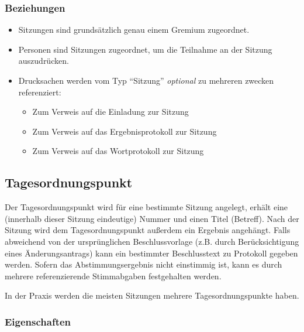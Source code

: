 \subsubsection{Beziehungen}

\begin{itemize}
\item
  Sitzungen sind grundsätzlich genau einem Gremium zugeordnet.
\item
  Personen sind Sitzungen zugeordnet, um die Teilnahme an der Sitzung
  auszudrücken.
\item
  Drucksachen werden vom Typ ``Sitzung'' \emph{optional} zu mehreren
  zwecken referenziert:

  \begin{itemize}
  \item
    Zum Verweis auf die Einladung zur Sitzung
  \item
    Zum Verweis auf das Ergebnisprotokoll zur Sitzung
  \item
    Zum Verweis auf das Wortprotokoll zur Sitzung
  \end{itemize}
\end{itemize}

\subsection{Tagesordnungspunkt}

Der Tagesordnungspunkt wird für eine bestimmte Sitzung angelegt, erhält
eine (innerhalb dieser Sitzung eindeutige) Nummer und einen Titel
(Betreff). Nach der Sitzung wird dem Tagesordnungspunkt außerdem ein
Ergebnis angehängt. Falls abweichend von der ursprünglichen
Beschlussvorlage (z.B. durch Berücksichtigung eines Änderungsantrags)
kann ein bestimmter Beschlusstext zu Protokoll gegeben werden. Sofern
das Abstimmungsergebnis nicht einstimmig ist, kann es durch mehrere
referenzierende Stimmabgaben festgehalten werden.

In der Praxis werden die meisten Sitzungen mehrere Tagesordnungspunkte
haben.

\subsubsection{Eigenschaften}

